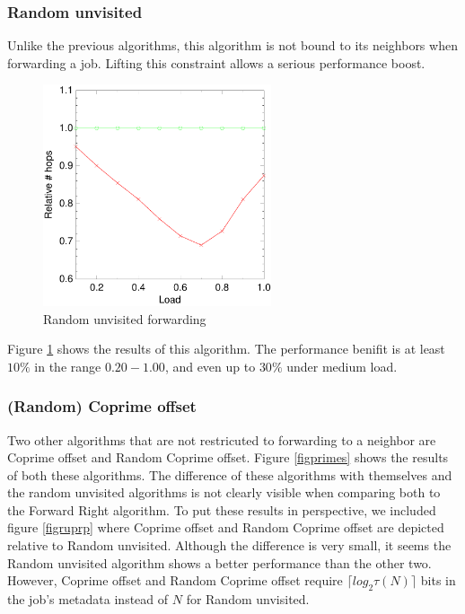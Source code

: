 \documentclass[10pt,a4paper]{article}
\begin{document}
\subsubsection*{Random unvisited}
Unlike the previous algorithms, this algorithm is not bound to its neighbors when forwarding a job. Lifting this constraint allows a serious performance boost.

\begin{figure}[h!tb]
\centering
\includegraphics[width=0.6\textwidth]{data/randunvisitedright.pdf}
\caption{Random unvisited forwarding}
\label{figrandunvisited}
\end{figure}

Figure \ref{figrandunvisited} shows the results of this algorithm. The performance benifit is at least $10 \%$ in the range $0.20 - 1.00$, and even up to $30 \%$ under medium load.

\subsubsection*{(Random) Coprime offset}
Two other algorithms that are not restricuted to forwarding to a neighbor are Coprime offset and Random Coprime offset. Figure \ref{figprimes} shows the results of both these algorithms. The difference of these algorithms with themselves and the random unvisited algorithms is not clearly visible when comparing both to the Forward Right algorithm. To put these results in perspective, we included figure \ref{figruprp} where Coprime offset and Random Coprime offset are depicted relative to Random unvisited. Although the difference is very small, it seems the Random unvisited algorithm shows a better performance than the other two. However, Coprime offset and Random Coprime offset require $\lceil log_2 \tau(N) \rceil$ bits in the job's metadata instead of $N$ for Random unvisited.
\end{document}
